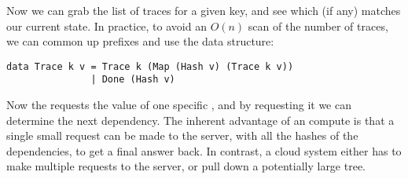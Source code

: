 Now we can grab the list of traces for a given key, and see which (if any) matches our current state. In practice, to avoid an $O(n)$ scan of the number of traces, we can common up prefixes and use the data structure:

\begin{verbatim}
data Trace k v = Trace k (Map (Hash v) (Trace k v))
               | Done (Hash v)
\end{verbatim}

Now the  requests the value of one specific , and by requesting it we can determine the next dependency. The inherent advantage of an  compute is that a single small request can be made to the server, with all the hashes of the dependencies, to get a final answer back. In contrast, a  cloud system either has to make multiple requests to the server, or pull down a potentially large  tree.
